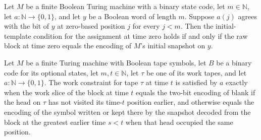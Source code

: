 \begin{lemma}
\label{Complexity.clA5Initial_meaning}
\leanok
{}
Let $M$ be a finite Boolean Turing machine with a binary state code, let $m\in\mathbb
N$, let $a:\mathbb N\to\{0,1\}$, and let $y$ be a Boolean word of length $m$. Suppose
$a(j)$ agrees with the bit of $y$ at zero-based position $j$ for every $j<m$. Then the
initial-template condition for the assignment at time zero holds if and only if the raw
block at time zero equals the encoding of $M$'s initial snapshot on $y$.
\end{lemma}

\begin{lemma}
\label{Complexity.clA5Work_meaning}
\leanok
{}
Let $M$ be a finite Turing machine with Boolean tape symbols, let $B$ be a binary code
for its optional states, let $m,t\in\mathbb{N}$, let $\tau$ be one of its work tapes,
and let $a:\mathbb{N}\to\{0,1\}$. The work constraint for tape $\tau$ at time $t$ is
satisfied by $a$ exactly when the work slice of the block at time $t$ equals the two-bit
encoding of blank if the head on $\tau$ has not visited its time-$t$ position earlier,
and otherwise equals the encoding of the symbol written or kept there by the snapshot
decoded from the block at the greatest earlier time $s<t$ when that head occupied the
same position.
\end{lemma}

